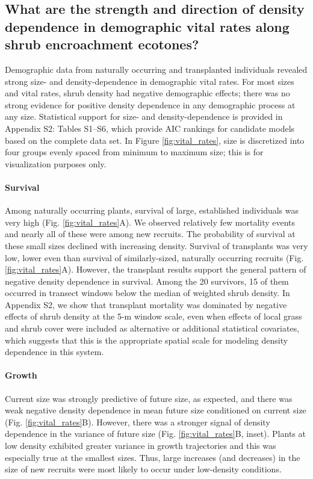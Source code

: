 \documentclass[11pt]{article}\usepackage[]{graphicx}\usepackage[usenames,dvipsnames]{xcolor}
\begin{document}
\subsection*{What are the strength and direction of density dependence in demographic vital rates along shrub encroachment ecotones?}
Demographic data from naturally occurring and transplanted individuals revealed strong size- and density-dependence in demographic vital rates. 
For most sizes and vital rates, shrub density had negative demographic effects; there was no strong evidence for positive density dependence in any demographic process at any size. 
Statistical support for size- and density-dependence is provided in Appendix S2: Tables S1--S6, which provide AIC rankings for candidate models based on the complete data set. 
In Figure \ref{fig:vital_rates}, size is discretized into four groups evenly spaced from minimum to maximum size; this is for visualization purposes only.

\paragraph{Survival}
Among naturally occurring plants, survival of large, established individuals was very high (Fig. \ref{fig:vital_rates}A).
We observed relatively few mortality events and nearly all of these were among new recruits. 
The probability of survival at these small sizes declined with increasing density. 
Survival of transplants was very low, lower even than survival of similarly-sized, naturally occurring recruits (Fig. \ref{fig:vital_rates}A). 
However, the transplant results support the general pattern of negative density dependence in survival. 
Among the 20 survivors, 15 of them occurred in transect windows below the median of weighted shrub density. 
In Appendix S2, we show that transplant mortality was dominated by negative effects of shrub density at the 5-m window scale, even when effects of local grass and shrub cover were included as alternative or additional statistical covariates, which suggests that this is the appropriate spatial scale for modeling density dependence in this system. 

\paragraph{Growth}
Current size was strongly predictive of future size, as expected, and there was weak negative density dependence in mean future size conditioned on current size (Fig. \ref{fig:vital_rates}B). 
However, there was a stronger signal of density dependence in the variance of future size (Fig. \ref{fig:vital_rates}B, inset).
Plants at low density exhibited greater variance in growth trajectories and this was especially true at the smallest sizes. 
Thus, large increases (and decreases) in the size of new recruits were most likely to occur under low-density conditions. 
\end{document}
